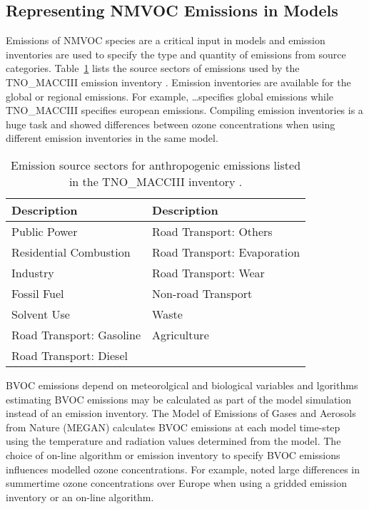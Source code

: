 \subsection{Representing NMVOC Emissions in Models}
Emissions of NMVOC species are a critical input in models and emission inventories are used to specify the type and quantity of emissions from source categories.
Table~\ref{t:SNAP} lists the source sectors of emissions used by the TNO\_MACCIII emission inventory \citep{Kuenen:2014}.
Emission inventories are available for the global or regional emissions.
For example, \ldots specifies global emissions while TNO\_MACCIII \citep{Kuenen:2014} specifies european emissions.
Compiling emission inventories is a huge task and  showed differences between ozone concentrations when using different emission inventories in the same model.
\begin{table}[t]%
    \centering%
    \caption[Emission source sectors in the TNO\_MACCIII]{Emission source sectors for anthropogenic emissions listed in the TNO\_MACCIII inventory \citep{Kuenen:2014}.}%
    \begin{tabular}{ll}%
        \hline \hline
        \textbf{Description} & \textbf{Description} \\
        \hline \hline
        Public Power & Road Transport: Others \\
        Residential Combustion & Road Transport: Evaporation \\
        Industry & Road Transport: Wear \\
        Fossil Fuel & Non-road Transport \\
        Solvent Use & Waste \\
        Road Transport: Gasoline & Agriculture \\
        Road Transport: Diesel & \\ 
        \hline \hline
    \end{tabular}%
    \label{t:SNAP}%
\end{table}%

BVOC emissions depend on meteorolgical and biological variables and lgorithms estimating BVOC emissions may be calculated as part of the model simulation instead of an emission inventory.
The Model of Emissions of Gases and Aerosols from Nature (MEGAN) \citep{Guenther:2006, Guenther:2012} calculates BVOC emissions at each model time-step using the temperature and radiation values determined from the model.
The choice of on-line algorithm or emission inventory to specify BVOC emissions influences modelled ozone concentrations. 
For example, \citet{Curci:2009} noted large differences in summertime ozone concentrations over Europe when using a gridded emission inventory or an on-line algorithm.

